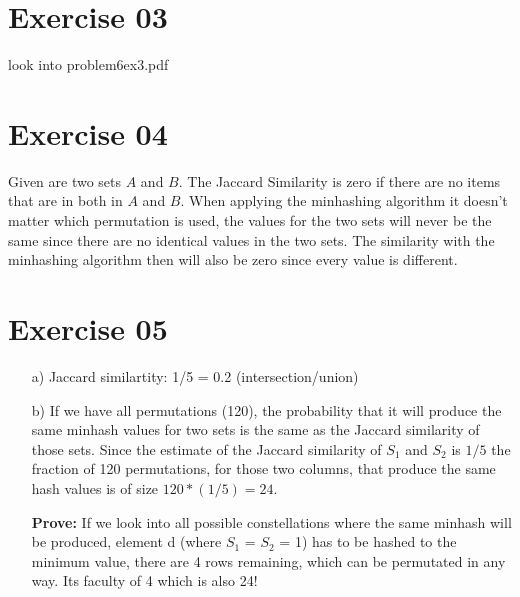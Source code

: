 \documentclass[11pt,a4paper]{scrartcl}
\begin{document}
\section*{Exercise 03}
	look into problem6ex3.pdf
\section*{Exercise 04}

Given are two sets $A$ and $B$. The Jaccard Similarity is zero if there are no items that are in both in $A$ and $B$. When applying the minhashing algorithm it doesn't matter which permutation is used, the values for the two sets will never be the same since there are no identical values in the two sets. The similarity with the minhashing algorithm then will also be zero since every value is different.

\section*{Exercise 05}
\begin{itemize}
\item [a)] Jaccard similartity: 1/5 = 0.2 (intersection/union)
\item [b)] 
If we have all permutations (120), the probability that it will produce the same minhash values for two sets is the same as the Jaccard similarity of those sets. Since the estimate of the Jaccard similarity of $S_1$ and $S_2$ is $1/5$ the fraction of 120 permutations, for those two columns, that produce the same hash values is of size $120 * (1/5) = 24$.

\textbf{Prove:} If we look into all possible constellations where the same minhash will be produced, element d (where $S_1$ = $S_2$ = 1) has to be hashed to the minimum value, there are 4 rows remaining, which can be permutated in any way. Its faculty of 4 which is also 24!\\\\\\
\end{itemize}
\end{document}
